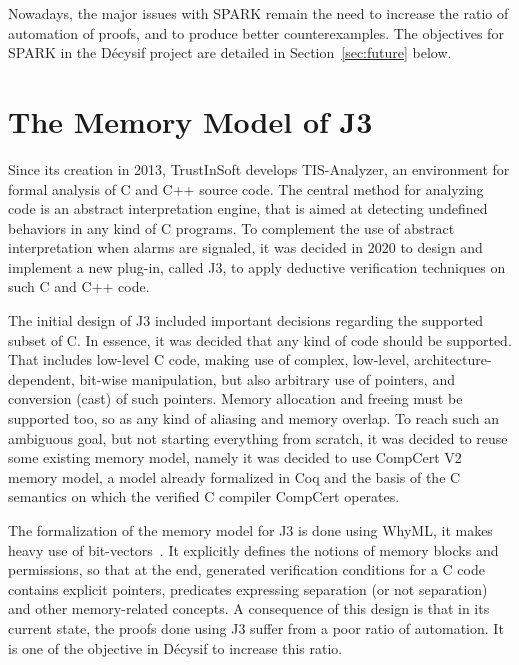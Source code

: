 \documentclass[a4paper,11pt]{article}
\begin{document}
Nowadays, the major issues with SPARK remain the need to increase the ratio of
automation of proofs, and to produce better counterexamples. The objectives for
SPARK in the Décysif project are detailed in Section~\ref{sec:future} below.

\section{The Memory Model of J3}
\label{sec:j3}


Since its creation in 2013, TrustInSoft develops TIS-Analyzer, an environment
for formal analysis of C and C++ source code. The central method for analyzing
code is an abstract interpretation engine, that is aimed at detecting undefined
behaviors in any kind of C programs. To complement the use of abstract
interpretation when alarms are signaled, it was decided in 2020 to design and implement
a new plug-in, called J3, to apply deductive verification techniques on such C
and C++ code.

The initial design of J3 included important decisions regarding the supported
subset of C. In essence, it was decided that any kind of code should be
supported. That includes low-level C code, making use of complex, low-level,
architecture-dependent, bit-wise manipulation, but also arbitrary use of
pointers, and conversion (cast) of such pointers. Memory allocation and freeing
must be supported too, so as any kind of aliasing and memory overlap. To reach
such an ambiguous goal, but not starting everything from scratch, it was decided
to reuse some existing memory model, namely it was decided to use CompCert
V2~\cite{leroy12rr} memory model, a model already formalized in Coq and the basis of
the C semantics on which the verified C compiler CompCert operates.

The formalization of the memory model for J3 is done using WhyML, it makes heavy
use of bit-vectors~\cite{fumex16nfm}. It explicitly defines the notions of memory
blocks and permissions, so that at the end, generated verification conditions
for a C code contains explicit pointers, predicates expressing separation (or
not separation) and other memory-related concepts. A consequence of this design
is that in its current state, the proofs done using J3 suffer from a poor ratio
of automation. It is one of the objective in Décysif to increase this ratio.
\end{document}
